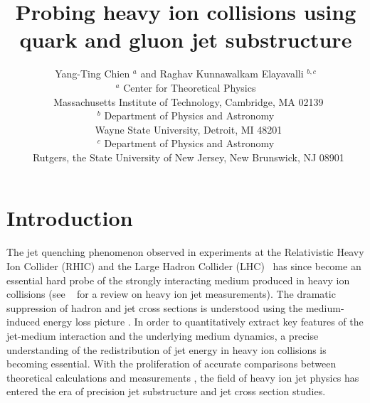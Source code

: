 \documentclass[notoc]{JHEP3}
\title{Probing heavy ion collisions using quark and gluon jet substructure}
\author{Yang-Ting Chien $^{a}$ and Raghav Kunnawalkam Elayavalli $^{b,c}$\\
$^{a}$ Center for Theoretical Physics\\
$~$ Massachusetts Institute of Technology, Cambridge, MA 02139\\
$^{b}$ Department of Physics and Astronomy\\
$~$ Wayne State University, Detroit, MI 48201\\
$^{c}$ Department of Physics and Astronomy\\
$~$ Rutgers, the State University of New Jersey, New Brunswick, NJ 08901
}
\begin{document}
\section{Introduction}
\label{sec:intro}

The jet quenching phenomenon observed in experiments at the Relativistic Heavy Ion Collider (RHIC) \cite{Adcox:2001jp,Adler:2002xw,Adcox:2004mh,Arsene:2004fa,Back:2004je,Adams:2005dq}
and the Large Hadron Collider (LHC)~\cite{Aamodt:2010jd,Aad:2010bu,Chatrchyan:2011sx,Aamodt:2011vg,CMS:2012aa,Chatrchyan:2012nia,Abelev:2012hxa,Chatrchyan:2012gt,Aad:2012vca,
Abelev:2013kqa,Aad:2013sla,Chatrchyan:2013exa,Aad:2014bxa,Khachatryan:2014bva,
Adam:2015ewa,Adam:2015doa,Aad:2015bsa,Khachatryan:2015lha,Aad:2015wga,
Khachatryan:2016odn,Khachatryan:2016xxp,Sirunyan:2016znt,Khachatryan:2016ypw,
Sirunyan:2017isk,Sirunyan:2017oug,Sirunyan:2017lzi,Sirunyan:2017jic,Sirunyan:2017xss,Sirunyan:2017qhf}
has since become an essential hard probe of the strongly interacting medium produced in heavy ion collisions (see ~\cite{Connors:2017ptx} for a review on heavy ion jet measurements). The dramatic suppression of hadron and jet cross sections is understood using the medium-induced energy loss picture \cite{Gyulassy:1993hr,Wang:1994fx,Zakharov:1996fv,Zakharov:1997uu,Baier:1996kr,Baier:1998kq,
Gyulassy:2000er,Gyulassy:2000fs,Wiedemann:2000za,Wang:2001ifa,
Arnold:2001ba,Arnold:2001ms,Arnold:2002ja,Casalderrey-Solana:2014bpa}. In order to quantitatively extract key features of the jet-medium interaction and the underlying medium dynamics, a precise understanding of the redistribution of jet energy in heavy ion collisions is becoming essential. With the proliferation of accurate comparisons between theoretical calculations and measurements \cite{Chatrchyan:2013kwa,Khachatryan:2016tfj,Chatrchyan:2012gw,Aad:2014wha,Chatrchyan:2014ava,Aaboud:2017bzv,Sirunyan:2018qec,Khachatryan:2016erx,
Acharya:2017goa,Sirunyan:2017bsd,CMS:2017xdn}, the field of heavy ion jet physics has entered the era of precision jet substructure and jet cross section studies.
\end{document}
